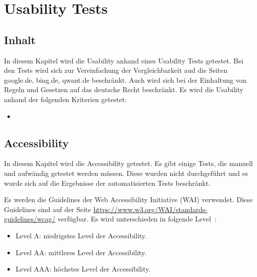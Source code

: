 \section{Usability Tests}\label{sec:usability}

\subsection{Inhalt}\label{subsec:inhalt}
In diesem Kapitel wird die Usability anhand eines Usability Tests getestet.
Bei den Tests wird sich zur Vereinfachung der Vergleichbarkeit aud die Seiten google.de, bing.de, qwant.de beschränkt.
Auch wird sich bei der Einhaltung von Regeln und Gesetzen auf das deutsche Recht beschränkt.\newline
Es wird die Usability anhand der folgenden Kriterien getestet:
\begin{itemize}
    \item{}
\end{itemize}

\subsection{Accessibility}\label{subsec:accessibility}
In diesem Kapitel wird die Accessibility getestet.
Es gibt einige Tests, die manuell und aufwändig getestet werden müssen.
Diese wurden nicht durchgeführt und es wurde sich auf die Ergebnisse der automatisierten Tests beschränkt.

Es werden die Guidelines der Web Accessibility Initiative (WAI) verwendet.
Diese Guidelines sind auf der Seite \url{https://www.w3.org/WAI/standards-guidelines/wcag/} verfügbar.\newline
Es wird unterschieden in folgende Level~\cite{WCAG21}:
\begin{itemize}
\item Level A: niedrigstes Level der Accessibility.
\item Level AA: mittleres Level der Accessibility.
\item Level AAA: höchstes Level der Accessibility.
\end{itemize}

